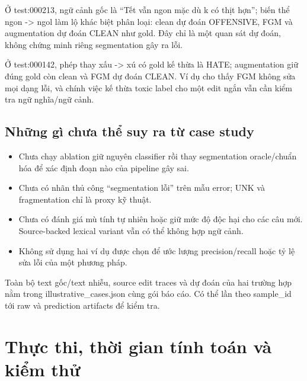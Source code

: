 \documentclass[11pt,a4paper]{article}
\begin{document}
Ở test:000213, ngữ cảnh gốc là “Tết vẫn ngon mặc dù k có thịt hợn”; biến thể ngon -> ngol làm lộ khác biệt phân loại: clean dự đoán OFFENSIVE, FGM và augmentation dự đoán CLEAN như gold. Đây chỉ là một quan sát dự đoán, không chứng minh riêng segmentation gây ra lỗi.


Ở test:000142, phép thay xấu -> xú có gold kế thừa là HATE; augmentation giữ đúng gold còn clean và FGM dự đoán CLEAN. Ví dụ cho thấy FGM không sửa mọi dạng lỗi, và chính việc kế thừa toxic label cho một edit ngắn vẫn cần kiểm tra ngữ nghĩa/ngữ cảnh.


\subsection*{Những gì chưa thể suy ra từ case study}

\begin{itemize}

\item Chưa chạy ablation giữ nguyên classifier rồi thay segmentation oracle/chuẩn hóa để xác định đoạn nào của pipeline gây sai.

\item Chưa có nhãn thủ công “segmentation lỗi” trên mẫu error; UNK và fragmentation chỉ là proxy kỹ thuật.

\item Chưa có đánh giá mù tính tự nhiên hoặc giữ mức độ độc hại cho các câu mới. Source-backed lexical variant vẫn có thể không hợp ngữ cảnh.

\item Không sử dụng hai ví dụ được chọn để ước lượng precision/recall hoặc tỷ lệ sửa lỗi của một phương pháp.

\end{itemize}

Toàn bộ text gốc/text nhiễu, source edit traces và dự đoán của hai trường hợp nằm trong illustrative\_cases.json cùng gói báo cáo. Có thể lần theo sample\_id tới raw và prediction artifacts để kiểm tra.


\FloatBarrier\section{Thực thi, thời gian tính toán và kiểm thử}
\end{document}

